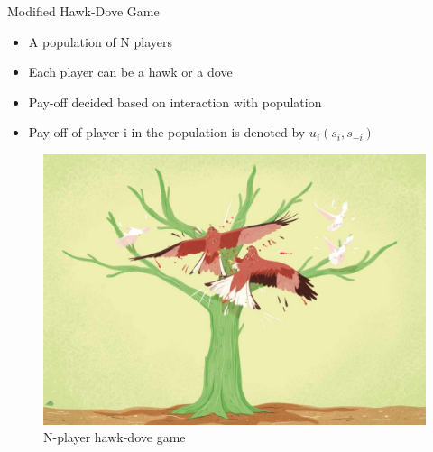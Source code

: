 \documentclass{IFES-beamer}
\begin{document}
        
        \begin{frame}{Modified Hawk-Dove Game}
            \begin{itemize}
                \item A population of N players
                \item Each player can be a hawk or a dove
                \item Pay-off decided based on interaction with population
                \item Pay-off of player i in the population is denoted by $u_i(s_i, s_{-i})$
            \end{itemize}
            \begin{figure}[H]
                \centering
                \includegraphics[scale=0.15]{Images/hawk_dove.jpg}
                \caption{N-player hawk-dove game}
            \end{figure}
        \end{frame}
        
\end{document}
